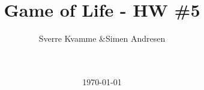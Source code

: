 



\title{Game of Life - HW \#5}
\author{Sverre Kvamme \&Simen Andresen}
\date{\ \\ \ \\ \today}




\maketitle


\pagestyle{fancy}
\lhead{}
\rhead{\thepage}
\setcounter{page}{1}

\rhead{\thepage}
\cfoot{}


%



